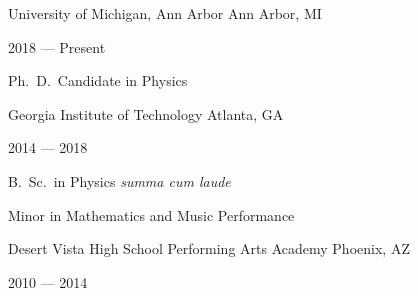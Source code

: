 \begin{minipage}[t]{0.2\textwidth}
	\flushleft
\end{minipage}
\begin{minipage}[t]{0.75\textwidth}
	\orgheader
	{University of Michigan, Ann Arbor}
	{Ann Arbor, MI}

	2018 --- Present
	
	Ph.\ D.\ Candidate in Physics

	\orgheader
	{Georgia Institute of Technology}
	{Atlanta, GA}

	2014 --- 2018

	B.\ Sc.\ in Physics \textit{summa cum laude}

	Minor in Mathematics and Music Performance

	\orgheader
	{Desert Vista High School Performing Arts Academy}
	{Phoenix, AZ}

	2010 --- 2014
\end{minipage}

\vspace{8pt}